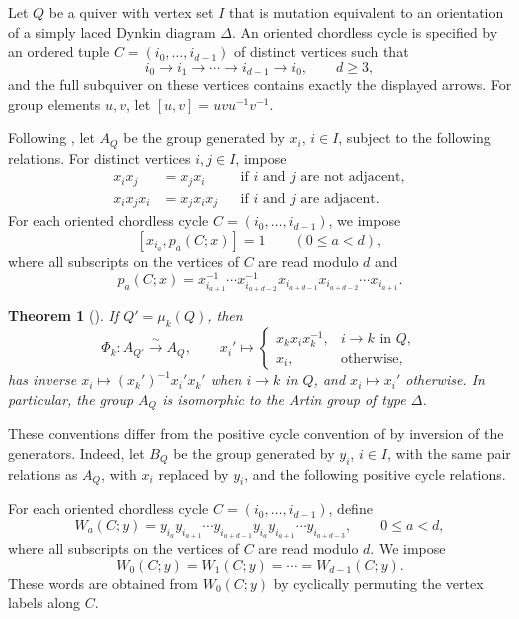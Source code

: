 \documentclass[a4paper, 12pt, reqno]{amsart}
\newtheorem{theorem}{Theorem}[section]
\theoremstyle{definition}
\begin{document}
Let $Q$ be a quiver with vertex set $I$ that is mutation equivalent to an orientation of a simply laced Dynkin diagram $\Delta$. An oriented chordless cycle is specified by an ordered tuple $C=(i_0,\ldots,i_{d-1})$ of distinct vertices such that
\[
i_0\longrightarrow i_1\longrightarrow\cdots
\longrightarrow i_{d-1}\longrightarrow i_0,
\qquad d\geq3,
\]
and the full subquiver on these vertices contains exactly the displayed arrows. For group elements $u,v$, let $[u,v]=uvu^{-1}v^{-1}$.


Following \cite[Definitions~4.4 and~4.5]{HHLP2017}, let $A_Q$ be the group generated by $x_i$, $i\in I$, subject to the following relations. For distinct vertices $i,j\in I$, impose
\[
\begin{aligned}
x_ix_j&=x_jx_i
&&\text{if $i$ and $j$ are not adjacent},\\
x_ix_jx_i&=x_jx_ix_j
&&\text{if $i$ and $j$ are adjacent}.
\end{aligned}
\]
For each oriented chordless cycle $C=(i_0,\ldots,i_{d-1})$, we impose
\[
[x_{i_a},p_a(C;x)]=1 \qquad(0\leq a<d),
\]
where all subscripts on the vertices of $C$ are read modulo $d$ and
\[
p_a(C;x)=x_{i_{a+1}}^{-1}\cdots x_{i_{a+d-2}}^{-1} x_{i_{a+d-1}} x_{i_{a+d-2}}\cdots x_{i_{a+1}}.
\]



\begin{theorem}[{\cite[Proposition~6.2 and Theorem~6.1]{HHLP2017}}]\label{thm:mutable}
If $Q'=\mu_k(Q)$, then
\[
\Phi_k:A_{Q'}\xrightarrow{\sim}A_Q,
\qquad x_i'\longmapsto
\begin{cases}x_kx_ix_k^{-1},&i\to k\text{ in }Q,\\x_i,&\text{otherwise},\end{cases}
\]
has inverse $x_i\mapsto (x_k')^{-1}x_i'x_k'$ when $i\to k$ in $Q$, and $x_i\mapsto x_i'$ otherwise. In particular, the group $A_Q$ is isomorphic to the Artin group of type $\Delta$. 
\end{theorem}


These conventions differ from the positive cycle convention of \cite[Definition 2.2]{GM2017} by inversion of the generators. Indeed, let $B_Q$ be the group generated by $y_i$, $i\in I$, with the same pair relations as $A_Q$, with $x_i$ replaced by $y_i$, and the following positive cycle relations.

For each oriented chordless cycle $C=(i_0,\ldots,i_{d-1})$, define
\[
W_a(C;y)=y_{i_a}y_{i_{a+1}}\cdots y_{i_{a+d-1}} y_{i_a}y_{i_{a+1}}\cdots y_{i_{a+d-3}}, \qquad 0\le a<d,
\]
where all subscripts on the vertices of $C$ are read modulo $d$. We impose
\[
 W_0(C;y)=W_1(C;y)=\cdots=W_{d-1}(C;y).
\]
These words are obtained from $W_0(C;y)$ by cyclically permuting the vertex labels along $C$.
\end{document}
